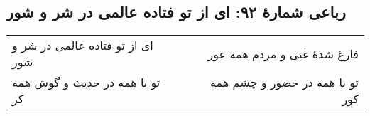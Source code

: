 \begin{center}
\section*{رباعی شمارهٔ ۹۲: ای از تو فتاده عالمی در شر و شور}
\label{sec:092}
\begin{longtable}{l p{0.5cm} r}
ای از تو فتاده عالمی در شر و شور
&&
فارغ شدهٔ غنی و مردم همه عور
\\
تو با همه در حدیث و گوش همه کر
&&
تو با همه در حضور و چشم همه کور
\\
\end{longtable}
\end{center}
